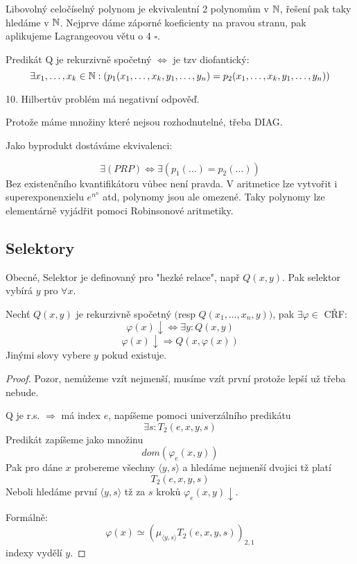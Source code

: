 Libovolný celočíselný polynom je ekvivalentní 2 polynomům v $\operatorname{\mathbb{N}}$, řešení pak taky hledáme v $\operatorname{\mathbb{N}}$.
Nejprve dáme záporné koeficienty na pravou stranu, pak aplikujeme Lagrangeovou větu o 4 $\square$.

\begin{theorem}[RDPM (BD)]\label{rdpm}
	Predikát Q je rekurzivně spočetný $\iff$ je tzv diofantický:
		\[ \exists x_1, \ldots, x_k \in \operatorname{\mathbb{N}}: (p_1(x_1, \ldots, x_k, y_1, \ldots, y_n) = p_2(x_1, \ldots, x_k, y_1, \ldots, y_n)) \]
\end{theorem}

\begin{consequence}
	10. Hilbertův problém má negativní odpověď.

	Protože máme množiny které nejsou rozhodnutelné, třeba DIAG.
\end{consequence}

\begin{amendment}\label{rdpm_am}
	Jako byprodukt dostáváme ekvivalenci:

	\[ \exists(PRP) \iff \exists(p_1(\ldots) = p_2(\ldots)) \]
	Bez existenčního kvantifikátoru vůbec není pravda.
	V aritmetice lze vytvořit i superexponenxielu $e^{n^n}$ atd, polynomy jsou ale omezené.
	Taky polynomy lze elementárně vyjádřit pomoci Robinsonové aritmetiky.
\end{amendment}

\subsection{Selektory}

Obecné, Selektor je definovaný pro "hezké relace", např $Q(x, y)$.
Pak selektor vybírá $y$ pro $\forall x$.

\begin{theorem}[O selektoru]\label{selector}
	Nechť $Q(x, y)$ je rekurzivně spočetný $($resp $Q(x_1, \ldots, x_n, y))$, pak $\exists \varphi \in$ CŘF:
	\[ \varphi(x) \downarrow \iff \exists y: Q(x, y) \]
		\[ \varphi(x) \downarrow \Rightarrow Q(x, \varphi(x)) \]
	Jinými slovy vybere $y$ pokud existuje.
\end{theorem}
\begin{proof}
	Pozor, nemůžeme vzít nejmenší, musíme vzít první protože lepší už třeba nebude.

	Q je r.s. $\Rightarrow$ má index $e$, napíšeme pomoci univerzálního predikátu
	\[ \exists s: T_2(e, x, y, s) \]
	Predikát zapíšeme jako množinu
	\[ dom(\varphi_e(x, y)) \]
	Pak pro dáne $x$ probereme všechny $\langle y, s \rangle$ a hledáme nejmenší dvojici tž platí
	\[ T_2(e, x, y, s) \]
	Neboli hledáme první $\langle y, s \rangle$ tž za $s$ kroků $\varphi_e(x,y) \downarrow$.

	Formálně:
	\[ \varphi(x) \simeq (\mu_{\langle y, s \rangle} T_2(e, x, y, s))_{2,1} \]
	indexy vydělí $y$.
\end{proof}

